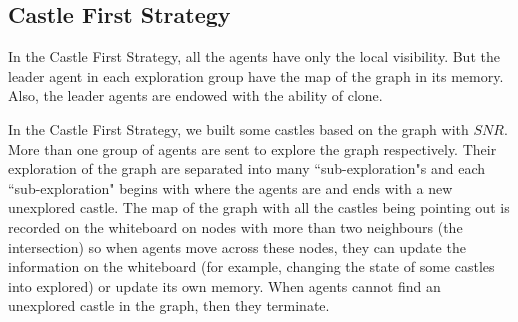 

               
\subsection{Castle First Strategy}
In the Castle First Strategy, all the agents have only the local visibility. But the leader agent in each exploration group have the map of the graph in its memory. Also, the leader agents are endowed with the ability of clone.

In the Castle First Strategy, we built some castles based on the graph with $SNR$. More than one group of agents are sent to explore the graph respectively. Their exploration of the graph are separated into many ``sub-exploration"s and each ``sub-exploration" begins with where the agents are and ends with a new unexplored castle. The map of the graph with all the castles being pointing out is recorded on the whiteboard on nodes with more than two neighbours (the intersection) so when agents move across these nodes, they can update the information on the whiteboard (for example, changing the state of some castles into explored) or update its own memory. When agents cannot find an unexplored castle in the graph, then they terminate. 

